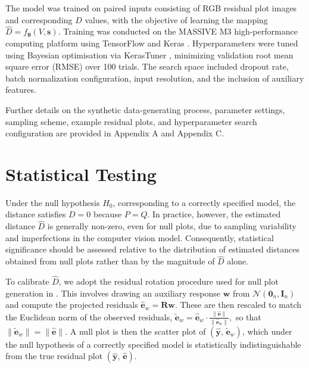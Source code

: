 \documentclass[]{interact}
\theoremstyle{plain}%
\theoremstyle{definition}
\theoremstyle{remark}
\begin{document}
The model was trained on paired inputs consisting of RGB residual plot
images and corresponding \(D\) values, with the objective of learning
the mapping \(\hat{D} = f_{\boldsymbol{\theta}}(V, \boldsymbol{s})\).
Training was conducted on the MASSIVE M3 high-performance computing
platform \citep{goscinski2014multi} using TensorFlow
\citep{abadi2016tensorflow} and Keras \citep{chollet2015keras}.
Hyperparameters were tuned using Bayesian optimisation via KerasTuner
\citep{omalley2019kerastuner}, minimizing validation root mean square
error (RMSE) over 100 trials. The search space included dropout rate,
batch normalization configuration, input resolution, and the inclusion
of auxiliary features.

Further details on the synthetic data-generating process, parameter
settings, sampling scheme, example residual plots, and hyperparameter
search configuration are provided in Appendix A and Appendix C.

\section{Statistical Testing}\label{sec-model-statistical-testing}

Under the null hypothesis \(H_0\), corresponding to a correctly
specified model, the distance satisfies \(D = 0\) because \(P = Q\). In
practice, however, the estimated distance \(\hat{D}\) is generally
non-zero, even for null plots, due to sampling variability and
imperfections in the computer vision model. Consequently, statistical
significance should be assessed relative to the distribution of
estimated distances obtained from null plots rather than by the
magnitude of \(\hat{D}\) alone.

To calibrate \(\hat{D}\), we adopt the residual rotation procedure used
for null plot generation in \citet{buja2009statistical}. This involves
drawing an auxiliary response \(\boldsymbol{w}\) from
\(\mathcal{N}(\boldsymbol{0}_n, \mathbf{I}_n)\) and compute the
projected residuals
\(\hat{\boldsymbol{e}}_w = \boldsymbol{R}\boldsymbol{w}\). These are
then rescaled to match the Euclidean norm of the observed residuals,
\(\tilde{\boldsymbol{e}}_w = \hat{\boldsymbol{e}}_w \cdot \frac{\|\hat{\boldsymbol{e}}\|}{\|\hat{\boldsymbol{e}}_w\|},\)
so that \(\|\tilde{\boldsymbol{e}}_w\| = \|\hat{\boldsymbol{e}}\|\). A
null plot is then the scatter plot of
\((\hat{\boldsymbol{y}},\, \tilde{\boldsymbol{e}}_w)\), which under the
null hypothesis of a correctly specified model is statistically
indistinguishable from the true residual plot
\((\hat{\boldsymbol{y}},\, \hat{\boldsymbol{e}})\).
\end{document}
